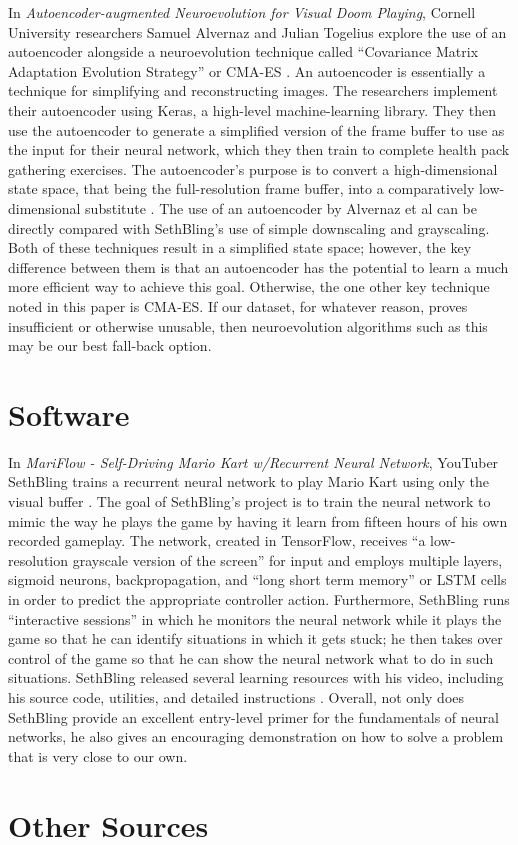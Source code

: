 In {\it Autoencoder-augmented Neuroevolution for Visual Doom Playing}, Cornell University researchers Samuel Alvernaz and Julian Togelius explore the use of an autoencoder alongside a neuroevolution technique called ``Covariance Matrix Adaptation Evolution Strategy'' or CMA-ES \cite{Alvernaz:2017}. An autoencoder is essentially a technique for simplifying and reconstructing images. The researchers implement their autoencoder using Keras, a high-level machine-learning library. They then use the autoencoder to generate a simplified version of the frame buffer to use as the input for their neural network, which they then train to complete health pack gathering exercises. The autoencoder's purpose is to convert a high-dimensional state space, that being the full-resolution frame buffer, into a comparatively low-dimensional substitute \cite{Alvernaz:2017}. The use of an autoencoder by Alvernaz et al can be directly compared with SethBling's use of simple downscaling and grayscaling. Both of these techniques result in a simplified state space; however, the key difference between them is that an autoencoder has the potential to learn a much more efficient way to achieve this goal. Otherwise, the one other key technique noted in this paper is CMA-ES. If our dataset, for whatever reason, proves insufficient or otherwise unusable, then neuroevolution algorithms such as this may be our best fall-back option.

\section{Software}

In {\it MariFlow - Self-Driving Mario Kart w/Recurrent Neural Network}, YouTuber SethBling trains a recurrent neural network to play Mario Kart using only the visual buffer \cite{SethBling:2017}. The goal of SethBling's project is to train the neural network to mimic the way he plays the game by having it learn from fifteen hours of his own recorded gameplay. The network, created in TensorFlow, receives ``a low-resolution grayscale version of the screen'' for input and employs multiple layers, sigmoid neurons, backpropagation, and ``long short term memory'' or LSTM cells in order to predict the appropriate controller action. Furthermore, SethBling runs ``interactive sessions'' in which he monitors the neural network while it plays the game so that he can identify situations in which it gets stuck; he then takes over control of the game so that he can show the neural network what to do in such situations. SethBling released several learning resources with his video, including his source code, utilities, and detailed instructions \cite{SethBling:2017}. Overall, not only does SethBling provide an excellent entry-level primer for the fundamentals of neural networks, he also gives an encouraging demonstration on how to solve a problem that is very close to our own.




\section{Other Sources}



